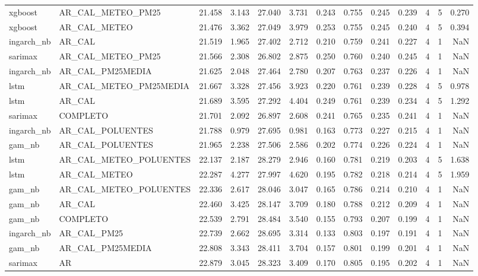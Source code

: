 \begin{tabular}{llrrrrrrrrrrr}
xgboost & AR_CAL_METEO_PM25 & 21.458 & 3.143 & 27.040 & 3.731 & 0.243 & 0.755 & 0.245 & 0.239 & 4 & 5 & 0.270 \\
xgboost & AR_CAL_METEO & 21.476 & 3.362 & 27.049 & 3.979 & 0.253 & 0.755 & 0.245 & 0.240 & 4 & 5 & 0.394 \\
ingarch_nb & AR_CAL & 21.519 & 1.965 & 27.402 & 2.712 & 0.210 & 0.759 & 0.241 & 0.227 & 4 & 1 & NaN \\
sarimax & AR_CAL_METEO_PM25 & 21.566 & 2.308 & 26.802 & 2.875 & 0.250 & 0.760 & 0.240 & 0.245 & 4 & 1 & NaN \\
ingarch_nb & AR_CAL_PM25MEDIA & 21.625 & 2.048 & 27.464 & 2.780 & 0.207 & 0.763 & 0.237 & 0.226 & 4 & 1 & NaN \\
lstm & AR_CAL_METEO_PM25MEDIA & 21.667 & 3.328 & 27.456 & 3.923 & 0.220 & 0.761 & 0.239 & 0.228 & 4 & 5 & 0.978 \\
lstm & AR_CAL & 21.689 & 3.595 & 27.292 & 4.404 & 0.249 & 0.761 & 0.239 & 0.234 & 4 & 5 & 1.292 \\
sarimax & COMPLETO & 21.701 & 2.092 & 26.897 & 2.608 & 0.241 & 0.765 & 0.235 & 0.241 & 4 & 1 & NaN \\
ingarch_nb & AR_CAL_POLUENTES & 21.788 & 0.979 & 27.695 & 0.981 & 0.163 & 0.773 & 0.227 & 0.215 & 4 & 1 & NaN \\
gam_nb & AR_CAL_POLUENTES & 21.965 & 2.238 & 27.506 & 2.586 & 0.202 & 0.774 & 0.226 & 0.224 & 4 & 1 & NaN \\
lstm & AR_CAL_METEO_POLUENTES & 22.137 & 2.187 & 28.279 & 2.946 & 0.160 & 0.781 & 0.219 & 0.203 & 4 & 5 & 1.638 \\
lstm & AR_CAL_METEO & 22.287 & 4.277 & 27.997 & 4.620 & 0.195 & 0.782 & 0.218 & 0.214 & 4 & 5 & 1.959 \\
gam_nb & AR_CAL_METEO_POLUENTES & 22.336 & 2.617 & 28.046 & 3.047 & 0.165 & 0.786 & 0.214 & 0.210 & 4 & 1 & NaN \\
gam_nb & AR_CAL & 22.460 & 3.425 & 28.147 & 3.709 & 0.180 & 0.788 & 0.212 & 0.209 & 4 & 1 & NaN \\
gam_nb & COMPLETO & 22.539 & 2.791 & 28.484 & 3.540 & 0.155 & 0.793 & 0.207 & 0.199 & 4 & 1 & NaN \\
ingarch_nb & AR_CAL_PM25 & 22.739 & 2.662 & 28.695 & 3.314 & 0.133 & 0.803 & 0.197 & 0.191 & 4 & 1 & NaN \\
gam_nb & AR_CAL_PM25MEDIA & 22.808 & 3.343 & 28.411 & 3.704 & 0.157 & 0.801 & 0.199 & 0.201 & 4 & 1 & NaN \\
sarimax & AR & 22.879 & 3.045 & 28.323 & 3.409 & 0.170 & 0.805 & 0.195 & 0.202 & 4 & 1 & NaN \\

\end{tabular}
